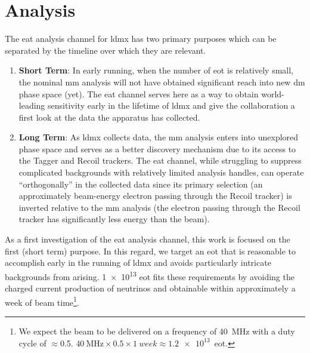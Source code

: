 \chapter{Analysis}
\label{chapter:ldmx:analysis}

The \ac{eat} analysis channel for \ac{ldmx} has two primary purposes which can
be separated by the timeline over which they are relevant.
\begin{enumerate}
	\item \textbf{Short Term}: In early running, when the number of \ac{eot} is
	      relatively small, the nominal \ac{mm} analysis will not have obtained
	      significant reach into new \ac{dm} phase space (yet). The \ac{eat} channel
	      serves here as a way to obtain world-leading sensitivity early in the lifetime
	      of \ac{ldmx} and give the collaboration a first look at the data the apparatus
	      has collected.
	\item \textbf{Long Term}: As \ac{ldmx} collects data, the \ac{mm}
	      analysis enters into unexplored phase space and serves as a better discovery
	      mechanism due to its access to the Tagger and Recoil trackers. The \ac{eat}
	      channel, while struggling to suppress complicated backgrounds with relatively
	      limited analysis handles, can operate ``orthogonally'' in the collected data
	      since its primary selection (an approximately beam-energy electron passing
	      through the Recoil tracker) is inverted relative to the \ac{mm} analysis
	      (the electron passing through the Recoil tracker has significantly less
	      energy than the beam).
\end{enumerate}
As a first investigation of the \ac{eat} analysis channel, this work is focused on
the first (short term) purpose. In this regard, we target an \ac{eot} that is reasonable
to accomplish early in the running of \ac{ldmx} and avoids particularly intricate backgrounds
from arising. \num{1e13} \ac{eot} fits these requirements by avoiding the charged current production
of neutrinos and obtainable within approximately a week of beam time\footnote{
	We expect the beam to be delivered on a frequency of \qty{40}{\mega\hertz} with a
	duty cycle of $\approx$\num{0.5}.
	$\qty{40}{\mega\hertz}\times0.5\times\qty{1}{week}\approx\num{1.2e13}$~\ac{eot}.
}.
